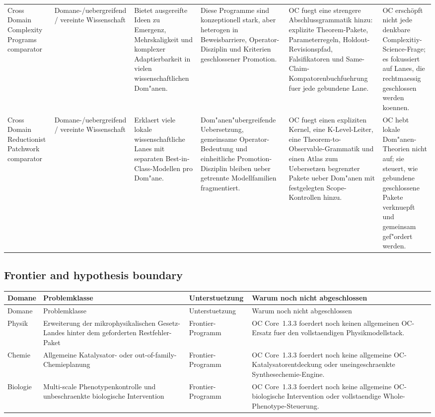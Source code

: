 \begin{longtable}{@{}L{0.17\textwidth}L{0.09\textwidth}L{0.17\textwidth}L{0.17\textwidth}L{0.20\textwidth}L{0.14\textwidth}@{}}
Cross Domain Complexity Programs comparator & Domane-/\allowbreak uebergreifend / vereinte Wissenschaft & Bietet ausgereifte Ideen zu Emergenz, Mehrskaligkeit und komplexer Adaptierbarkeit in vielen wissenschaftlichen Dom"anen. & Diese Programme sind konzeptionell stark, aber heterogen in Beweisbarriere, Operator-Disziplin und Kriterien geschlossener Promotion. & OC fuegt eine strengere Abschlussgrammatik hinzu: explizite Theorem-Pakete, Parameterregeln, Holdout-Revisionspfad, Falsifikatoren und Same-Claim-Kompatorenbuchfuehrung fuer jede gebundene Lane. & OC erschöpft nicht jede denkbare Complexitiy-Science-Frage; es fokussiert auf Lanes, die rechtmaessig geschlossen werden koennen. \\
Cross Domain Reductionist Patchwork comparator & Domane-/\allowbreak uebergreifend / vereinte Wissenschaft & Erklaert viele lokale wissenschaftliche Lanes mit separaten Best-in-Class-Modellen pro Dom"ane. & Dom"anen"ubergreifende Uebersetzung, gemeinsame Operator-Bedeutung und einheitliche Promotion-Disziplin bleiben ueber getrennte Modellfamilien fragmentiert. & OC fuegt einen expliziten Kernel, eine K-Level-Leiter, eine Theorem-to-Observable-Grammatik und einen Atlas zum Uebersetzen begrenzter Pakete ueber Dom"anen mit festgelegten Scope-Kontrollen hinzu. & OC hebt lokale Dom"anen-Theorien nicht auf; sie steuert, wie gebundene geschlossene Pakete verknuepft und gemeinsam gef"ordert werden. \\
\bottomrule
\end{longtable}

\subsection{Frontier and hypothesis boundary}
\begin{longtable}{@{}L{0.11\textwidth}L{0.19\textwidth}L{0.14\textwidth}L{0.48\textwidth}@{}}
\toprule
Domane & Problemklasse & Unterstuetzung & Warum noch nicht abgeschlossen \\
\midrule
\endfirsthead
\toprule
Domane & Problemklasse & Unterstuetzung & Warum noch nicht abgeschlossen \\
\midrule
\endhead
Physik & Erweiterung der mikrophysikalischen Gesetz-Landes hinter dem geforderten Restfehler-Paket & Frontier-Programm & OC Core~1.3.3 foerdert noch keinen allgemeinen OC-Ersatz fuer den vollstaendigen Physikmodellstack. \\
Chemie & Allgemeine Katalysator- oder out-of-family-Chemieplanung & Frontier-Programm & OC Core~1.3.3 foerdert noch keine allgemeine OC-Katalysatorentdeckung oder uneingeschraenkte Synthesechemie-Engine. \\
Biologie & Multi-scale Phenotypenkontrolle und unbeschraenkte biologische Intervention & Frontier-Programm & OC Core~1.3.3 foerdert noch keine allgemeine OC-biologische Intervention oder vollstaendige Whole-Phenotype-Steuerung. \\
\bottomrule
\end{longtable}
\endgroup
